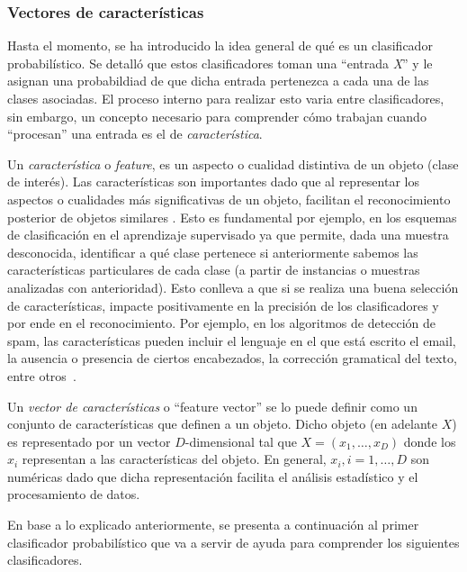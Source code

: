 \subsubsection{Vectores de características} \label{subsection:feature}
	
	Hasta el momento, se ha introducido la idea general de qué es un clasificador probabilístico. Se detalló que estos clasificadores toman una ``entrada \textit{X}'' y le asignan una probabildiad de que dicha entrada pertenezca a cada una de las clases asociadas. El proceso interno para realizar esto varia entre clasificadores, sin embargo, un concepto necesario para comprender cómo trabajan cuando ``procesan'' una entrada es el de \textit{característica}.

	Un \textit{característica} o \textit{feature}, es un aspecto o cualidad distintiva de un objeto (clase de interés). Las características son importantes dado que al representar los aspectos o cualidades más significativas de un objeto, facilitan el reconocimiento posterior de objetos similares \cite{OIVIND95}. Esto es fundamental por ejemplo, en los esquemas de clasificación en el aprendizaje supervisado ya que permite, dada una muestra desconocida, identificar a qué clase pertenece si anteriormente sabemos las características particulares de cada clase (a partir de instancias o muestras analizadas con anterioridad). Esto conlleva a que si se realiza una buena selección de características, impacte positivamente en la precisión de los clasificadores y por ende en el reconocimiento. Por ejemplo, en los algoritmos de detección de spam, las características pueden incluir el lenguaje en el que está escrito el email, la ausencia o presencia de ciertos encabezados, la corrección gramatical del texto, entre otros~\cite{SpamPaper}.

	Un \textit{vector de características} o ``feature vector'' se lo puede definir como un conjunto de características que definen a un objeto. Dicho objeto (en adelante $X$) es representado por un vector $D$-dimensional tal que  $X=(x_1,\dots,x_D)$ donde los $x_i$ representan a las características del objeto. En general, $x_i, i=1,\dots,D$ son numéricas dado que dicha representación facilita el análisis estadístico y el procesamiento de datos.

	En base a lo explicado anteriormente, se presenta a continuación al primer clasificador probabilístico que va a servir de ayuda para comprender los siguientes clasificadores.
		
	
